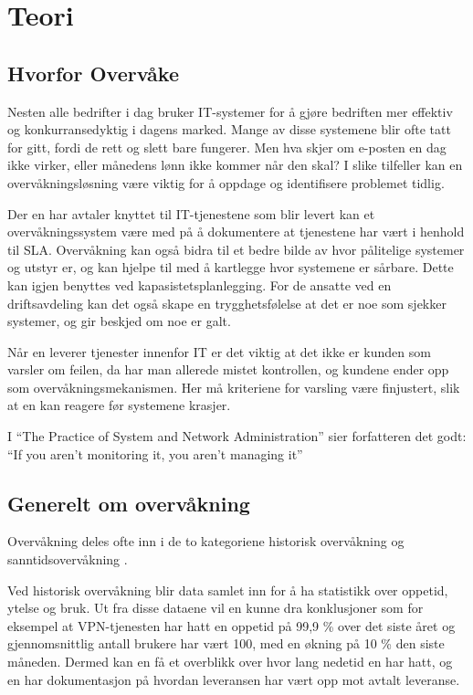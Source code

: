 \section{Teori}
\subsection{Hvorfor Overvåke}
Nesten alle bedrifter i dag bruker IT-systemer for å gjøre bedriften mer effektiv og konkurransedyktig i dagens marked. Mange av disse systemene blir ofte tatt for gitt, fordi de rett og slett bare fungerer. Men hva skjer om e-posten en dag ikke virker, eller månedens lønn ikke kommer når den skal? I slike tilfeller kan en overvåkningsløsning være viktig for å oppdage og identifisere problemet tidlig.

Der en har avtaler knyttet til IT-tjenestene som blir levert kan et overvåkningssystem være med på å dokumentere at tjenestene har vært i henhold til SLA. Overvåkning kan også bidra til et bedre bilde av hvor pålitelige systemer og utstyr er, og kan hjelpe til med å kartlegge hvor systemene er sårbare. Dette kan igjen benyttes ved kapasistetsplanlegging. For de ansatte ved en driftsavdeling kan det også skape en trygghetsfølelse at det er noe som sjekker systemer, og gir beskjed om noe er galt.

Når en leverer tjenester innenfor IT er det viktig at det ikke er kunden som varsler om feilen, da har man allerede mistet kontrollen, og kundene ender opp som overvåkningsmekanismen. Her må kriteriene for varsling være finjustert, slik at en kan reagere før systemene krasjer.

I “The Practice of System and Network Administration” sier forfatteren det godt: ``If you aren’t monitoring it, you aren’t managing it''

\subsection{Generelt om overvåkning}
Overvåkning deles ofte inn i de to kategoriene historisk overvåkning og sanntidsovervåkning \cite{Practice of System and network adm.}. 

Ved historisk overvåkning blir data samlet inn for å ha statistikk over oppetid, ytelse og bruk. Ut fra disse dataene vil en kunne dra konklusjoner som for eksempel at VPN-tjenesten har hatt en oppetid på 99,9 \% over det siste året og gjennomsnittlig antall brukere har vært 100, med en økning på 10 \% den siste måneden. Dermed kan en få et overblikk over hvor lang nedetid en har hatt, og en har dokumentasjon på hvordan leveransen har vært opp mot avtalt leveranse.

